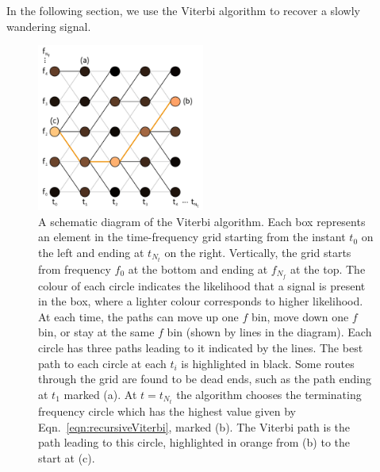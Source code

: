 \documentclass[paper-main.tex]{subfiles}
\begin{document}
In the following section, we use the Viterbi algorithm to recover a slowly wandering signal.



\begin{figure}
\includegraphics[width=0.49\textwidth]{figures/viterbiDiagram.pdf}
\caption{\label{fig:viterbi}
A schematic diagram of the Viterbi algorithm. 
Each box represents an element in the time-frequency grid starting from the instant $t_0$ on the left and ending at $t_{N_t}$ on the right. 
Vertically, the grid starts from frequency $f_0$ at the bottom and ending at $f_{N_f}$ at the top. 
The colour of each circle indicates the likelihood that a signal is present in the box, where a lighter colour corresponds to higher likelihood. 
At each time, the paths can move up one $f$ bin, move down one $f$ bin, or stay at the same $f$ bin (shown by lines in the diagram). 
Each circle has three paths leading to it indicated by the lines. 
The best path to each circle at each $t_i$ is highlighted in black. 
Some routes through the grid are found to be dead ends, such as the path ending at $t_1$ marked (a). 
At $t=t_{N_t}$ the algorithm chooses the terminating frequency circle which has the highest value given by Eqn.~\ref{eqn:recursiveViterbi}, marked (b). 
The Viterbi path is the path leading to this circle, highlighted in orange from (b) to the start at (c). 
}
\end{figure}
\end{document}
